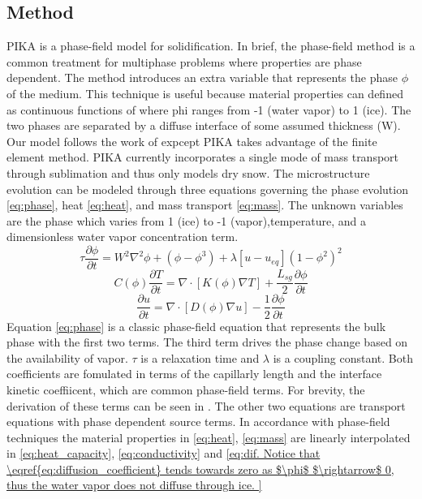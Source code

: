 \documentclass[twoside]{article}
\begin{document}
\begin{multicols}{2}
\section{Method}
PIKA is a phase-field model for solidification. In brief, the phase-field method is a common treatment for multiphase problems where properties are phase dependent. The method introduces an extra variable that represents the phase $\phi$ of the medium. This technique is useful because material properties can defined as continuous functions of where phi ranges from -1 (water vapor) to 1 (ice). The two phases are separated by a diffuse interface of some assumed thickness (W). Our model follows the work of \cite{Plapp_2009} expcept PIKA takes advantage of the finite element method. 
PIKA currently incorporates a single mode of mass transport through sublimation and thus only models dry snow. The microstructure evolution can be modeled through three equations governing the phase evolution \eqref{eq:phase}, heat \eqref{eq:heat}, and mass transport \eqref{eq:mass}. The unknown variables are the phase which varies from 1 (ice) to -1 (vapor),temperature, and a dimensionless water vapor concentration term.
 \begin{equation} \label{eq:phase}
	\tau \frac{\partial \phi}{\partial t} = W^2 \nabla^2 \phi +(\phi-\phi^3)+\lambda[u-u_{eq}](1-\phi^2)^2 
\end{equation}
\begin{equation}\label{eq:heat}
	C(\phi)\frac{\partial T}{\partial t} = \nabla \cdot [K(\phi) \nabla T] + \frac{L_{sg}}{2}\frac{\partial \phi}{\partial t}
\end{equation} 
\begin{equation} \label{eq:mass}
	\frac{\partial u}{\partial t} = \nabla \cdot[ D(\phi) \nabla u] - \frac{1}{2}\frac{\partial \phi}{\partial t}
\end{equation}
Equation \eqref{eq:phase} is a classic phase-field equation that represents the bulk phase with the first two terms. The third term drives the phase change based on the availability of vapor. $\tau$ is a relaxation time and $\lambda$ is a coupling constant. Both coefficients are fomulated in terms of the capillarly length and the interface kinetic coeffiicent, which are common phase-field terms. For brevity, the derivation of these terms can be seen in \cite{Plapp_2009}. The other two equations are transport equations with phase dependent source terms. In accordance with phase-field techniques the material properties in  \eqref{eq:heat}, \eqref{eq:mass} are linearly interpolated in \eqref{eq:heat_capacity}, \eqref{eq:conductivity} and \eqref{eq:dif. Notice that \eqref{eq:diffusion_coefficient} tends towards zero as $\phi$ $\rightarrow$ 0, thus the water vapor does not diffuse through ice.
}
\end{multicols}
\end{document}
